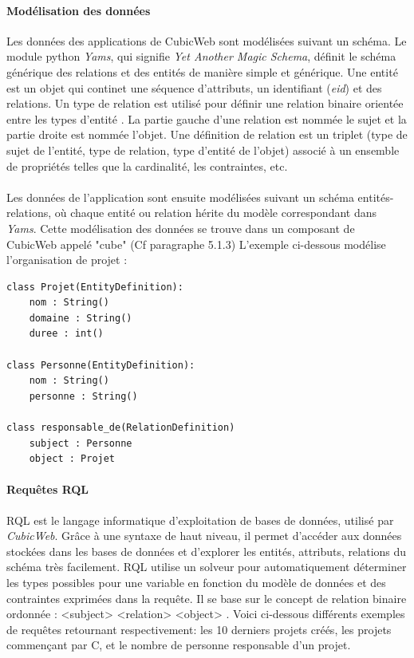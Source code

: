 \documentclass {report}
\begin{document}
\paragraph{Modélisation des données}
Les données des applications de CubicWeb sont modélisées suivant un schéma. Le module python \textit{Yams}, qui signifie \textit{Yet Another Magic Schema}, définit le schéma générique des relations et des entités de manière simple et générique. Une entité est un objet qui continet une séquence d'attributs, un identifiant (\textit{eid}) et des relations. Un type de relation est utilisé pour définir une relation binaire orientée entre les types d'entité . La partie gauche d'une relation est nommée le sujet et la partie droite est nommée l'objet. Une définition de relation est un triplet (type de sujet de l'entité, type de relation, type d'entité de l'objet) associé à un ensemble de propriétés telles que la cardinalité, les contraintes, etc.

\paragraph{}
Les données de l'application sont ensuite modélisées suivant un schéma entités-relations, où chaque entité ou relation hérite du modèle correspondant dans \textit{Yams}. Cette modélisation des données se trouve dans un composant de CubicWeb appelé "cube" (Cf paragraphe 5.1.3) L'exemple ci-dessous modélise l'organisation de projet :

\renewcommand{\lstlistingname}{Exemple}
\begin{lstlisting}[caption= Schéma de l'organisation d'un projet]
class Projet(EntityDefinition):
	nom : String()
	domaine : String()
	duree : int()

class Personne(EntityDefinition):
	nom : String()
	personne : String()
	
class responsable_de(RelationDefinition)
	subject : Personne
	object : Projet
\end{lstlisting}

\paragraph{Requêtes RQL}
RQL est le langage informatique d'exploitation de bases de données, utilisé par \textit{CubicWeb}. Grâce à une syntaxe de haut niveau, il permet d'accéder aux données stockées dans les bases de données et d'explorer les entités, attributs, relations du schéma très facilement. RQL utilise un solveur pour automatiquement déterminer les types possibles pour une variable en fonction du modèle de données et des contraintes exprimées dans la requête. Il se base sur le concept de relation binaire ordonnée : <subject> <relation> <object> . Voici ci-dessous différents exemples de requêtes retournant respectivement: les 10 derniers projets créés, les projets commençant par C, et le nombre de personne responsable d'un projet.
\end{document}
